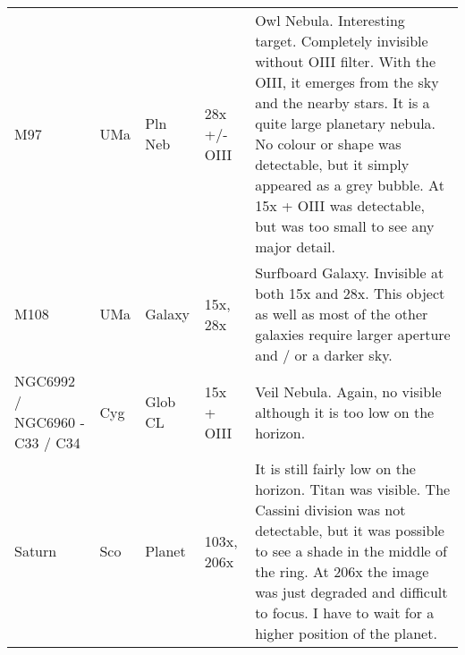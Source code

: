 \begin{longtable}{ p{0.8in}  p{0.3in}  p{0.5in}  p{0.9in}  p{5.8in} }
M97 & UMa & Pln Neb & 28x +/- OIII & Owl Nebula. Interesting target. Completely invisible without OIII filter. With the OIII, it emerges from the sky and the nearby stars. It is a quite large planetary nebula. No colour or shape was detectable, but it simply appeared as a grey bubble. At 15x + OIII was detectable, but was too small to see any major detail. \\ 
M108 & UMa & Galaxy & 15x, 28x & Surfboard Galaxy. Invisible at both 15x and 28x. This object as well as most of the other galaxies require larger aperture and / or a darker sky. \\ 
NGC6992 / NGC6960 - C33 / C34 & Cyg & Glob CL & 15x + OIII & Veil Nebula. Again, no visible although it is too low on the horizon. \\ 
Saturn & Sco & Planet & 103x, 206x & It is still fairly low on the horizon. Titan was visible. The Cassini division was not detectable, but it was possible to see a shade in the middle of the ring. At 206x the image was just degraded and difficult to focus. I have to wait for a higher position of the planet. \\ 
\hline 
\end{longtable} 
